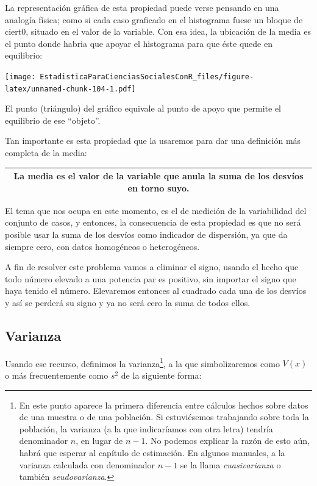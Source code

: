 \documentclass[]{book}
\let\rmarkdownfootnote\footnote%
\def\footnote{\protect\rmarkdownfootnote}
\begin{document}
La representación gráfica de esta propiedad puede verse pensando en una analogía física; como si cada caso graficado en el histograma fuese un bloque de ciert0, situado en el valor de la variable. Con esa idea, la ubicación de la media es el punto donde habria que apoyar el histograma para que éste quede en equilibrio:

\texttt{[image: EstadisticaParaCienciasSocialesConR\_files/figure-latex/unnamed-chunk-104-1.pdf]}

El punto (triángulo) del gráfico equivale al punto de apoyo que permite el equilibrio de ese ``objeto''.

Tan importante es esta propiedad que la usaremos para dar
una definición más completa de la media:

\begin{longtable}[]{@{}c@{}}
\toprule
\endhead
\begin{minipage}[t]{0.97\columnwidth}\centering
La \textbf{media} es el valor de la variable que anula la suma de los desvíos en torno suyo.\strut
\end{minipage}\tabularnewline
\bottomrule
\end{longtable}

El tema que nos ocupa en este momento, es el de medición de la
variabilidad del conjunto de casos, y entonces, la consecuencia de esta propiedad es que no será posible usar la suma de los desvíos como indicador de dispersión, ya que da siempre cero, con datos homogéneos o heterogéneos.

A fin de resolver este problema vamos a eliminar el signo, usando el
hecho que todo número elevado a una potencia par es positivo, sin
importar el signo que haya tenido el número. Elevaremos entonces al
cuadrado cada una de los desvíos y así se perderá su signo y ya no será cero la suma de todos ellos.

\hypertarget{varianza}{%
\subsection{Varianza}\label{varianza}}

Usando ese recurso, definimos la varianza\footnote{En este punto aparece la primera diferencia entre cálculos hechos sobre datos de una muestra o de una población. Si estuviésemos trabajando sobre toda la población, la varianza (a la que indicaríamos con otra letra) tendría denominador \(n\), en lugar de \(n-1\). No podemos explicar la razón de esto aún, habrá que esperar al capítulo de estimación. En algunos manuales, a la varianza calculada con denominador \(n-1\) se la llama \emph{cuasivarianza} o también \emph{seudovarianza}.}, a la que simbolizaremos como \(V(x)\) o más frecuentemente como \(s^2\) de la siguiente forma:
\end{document}
